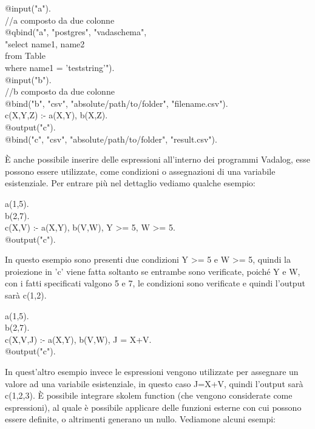 \begin{algorithm}[h]
	@input("a"). \\
	//a composto da due colonne \\
	@qbind("a", "postgres", "vadaschema", \\
	"select name1, name2\\
	from Table\\
	where name1 = 'teststring'"). \\
	@input("b"). \\
	//b composto da due colonne \\
	@bind("b", "csv", "absolute/path/to/folder", "filename.csv"). \\
	c(X,Y,Z) :- a(X,Y), b(X,Z). \\
	@output("c"). \\
	@bind("c", "csv", "absolute/path/to/folder", "result.csv").
\end{algorithm}

È anche possibile inserire delle espressioni all'interno dei programmi Vadalog, esse possono essere utilizzate, come condizioni o assegnazioni di una variabile esistenziale. Per entrare più nel dettaglio vediamo qualche esempio: 

\begin{algorithm}[h]
	a(1,5). \\
	b(2,7). \\
	c(X,V) :- a(X,Y), b(V,W), Y >= 5, W >= 5. \\
	@output("c"). 
\end{algorithm}

In questo esempio sono presenti due condizioni Y >= 5 e W >= 5, quindi la proiezione in 'c' viene fatta soltanto se entrambe sono verificate, poiché Y e W, con i fatti specificati valgono 5 e 7, le condizioni sono verificate e quindi l'output sarà c(1,2). \newline

\begin{algorithm}[h]
	a(1,5). \\
	b(2,7). \\
	c(X,V,J) :- a(X,Y), b(V,W), J = X+V. \\
	@output("c").
\end{algorithm}

In quest'altro esempio invece le espressioni vengono utilizzate per assegnare un valore ad una variabile esistenziale, in questo caso J=X+V, quindi l'output sarà c(1,2,3). \newline
È possibile integrare skolem function (che vengono considerate come espressioni), al quale è possibile applicare delle funzioni esterne con cui possono essere definite, o altrimenti generano un nullo. Vediamone alcuni esempi:

